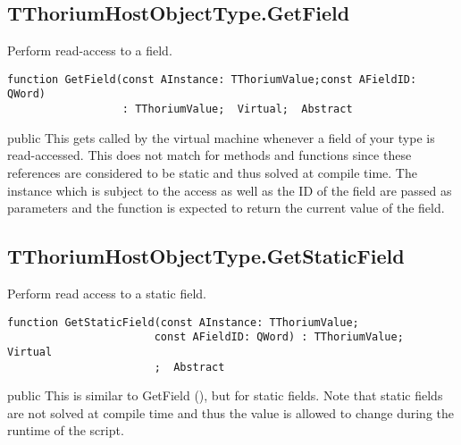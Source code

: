 \subsection{TThoriumHostObjectType.GetField}
\label{thoriumcorepkg:thorium:tthoriumhostobjecttype:getfield}
\begin{FPCList}
\Synopsis
Perform read-access to a field.\Declaration 

\begin{verbatim}
function GetField(const AInstance: TThoriumValue;const AFieldID: QWord)
                  : TThoriumValue;  Virtual;  Abstract
\end{verbatim}
\Visibility
public
\Description
This gets called by the virtual machine whenever a field of your type is read-accessed. This does not match for methods and functions since these references are considered to be static and thus solved at compile time. The instance which is subject to the access as well as the ID of the field are passed as parameters and the function is expected to return the current value of the field.\end{FPCList}
\subsection{TThoriumHostObjectType.GetStaticField}
\label{thoriumcorepkg:thorium:tthoriumhostobjecttype:getstaticfield}
\begin{FPCList}
\Synopsis
Perform read access to a static field.\Declaration 

\begin{verbatim}
function GetStaticField(const AInstance: TThoriumValue;
                       const AFieldID: QWord) : TThoriumValue;  Virtual
                       ;  Abstract
\end{verbatim}
\Visibility
public
\Description
This is similar to GetField (\pageref{thoriumcorepkg:thorium:tthoriumhostobjecttype:getfield}), but for static fields. Note that static fields are not solved at compile time and thus the value is allowed to change during the runtime of the script.\end{FPCList}

